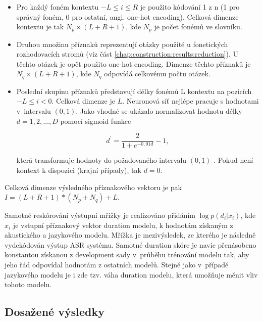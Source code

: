 \begin{itemize}
  \item Pro každý foném kontextu $-L \leq i \leq R$ je použito kódování 1 z n (1 pro správný foném, 0 pro ostatní, angl. one-hot encoding). Celková dimenze kontextu je tak $N_{p} \times \left(L + R + 1\right)$, kde $N_{p}$ je počet fonémů ve slovníku.
  \item Druhou množinu příznaků reprezentují otázky použité u fonetických rozhodovacích stromů (viz část \ref{chap:construction:results:reduction}). U těchto otázek je opět použito one-hot encoding. Dimenze těchto příznaků je $N_{q} \times \left(L + R + 1\right)$, kde $N_{q}$ odpovídá celkovému počtu otázek.
  \item Poslední skupinu příznaků představují délky fonémů L kontextu na pozicích $-L \leq i < 0$. Celková dimenze je $L$. Neuronová síť nejlépe pracuje s hodnotami v~intervalu $\left(0, 1\right)$. Jako vhodné se ukázalo normalizovat hodnotu délky $d=1, 2, \dots, D$ pomocí sigmoid funkce

  \begin{equation}
    d^{\prime} = \frac{2}{1 + e^{-0,01d}} - 1,
    \label{eq:realisation:durationmodels:nn:normalization}
  \end{equation}

  \noindent která transformuje hodnoty do požadovaného intervalu $\left(0, 1\right)$ \cite{Alumae2014}. Pokud není kontext k dispozici (krajní případy), tak $d = 0$.
\end{itemize}

\noindent Celková dimenze výsledného příznakového vektoru je pak $I = \left(L + R + 1\right) \ast \left(N_{p} + N_{q}\right) + L$.

Samotné reskórování výstupní mřížky je realizováno přidáním $\log p\left(d_{i}| x_{i}\right)$, kde $x_{i}$ je vstupní příznakový vektor duration modelu, k hodnotám získaným z akustického a jazykového modelu. Mřížka je mezivýsledek, ze kterého je následně vydekódován výstup ASR systému. Samotné duration skóre je navíc přenásobeno konstantou získanou z development sady v~průběhu trénování modelu tak, aby jeho řád odpovídal hodnotám z ostatních modelů. \cite{Hadian2017} Stejně jako v~případě jazykového modelu je i zde tzv. váha duration modelu, která umožňuje měnit vliv tohoto modelu.

\subsection{Dosažené výsledky}
\label{chap:realisation:durationmodels:nn:softmax:results}

